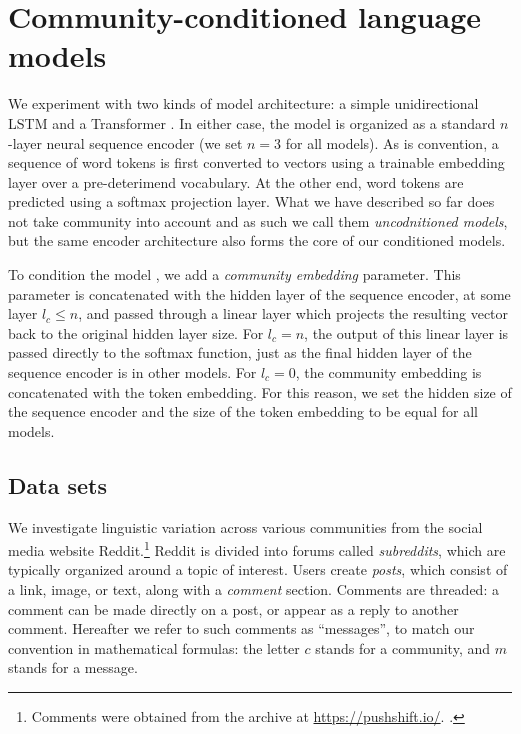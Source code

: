 \documentclass[11pt]{article}
\begin{document}

\section{Community-conditioned language models}

We experiment with two kinds of model architecture: a simple
unidirectional LSTM \citep{Hochreiter1997} and a Transformer
\citep{Vaswani2017}.  In either case, the model is organized as a
standard $n$-layer neural sequence encoder (we set $n=3$ for all
models). As is convention, a sequence of word tokens is first converted to 
vectors using a trainable embedding layer over a pre-deterimend vocabulary.
At the other end, word tokens are predicted using a softmax projection 
layer. What we have described so far does not take community into account
and as such we call them \emph{uncodnitioned models}, but the same
encoder architecture also forms the core of our conditioned models.

To condition the model , we add a \emph{community embedding} parameter.
This parameter is concatenated with the hidden layer of the
sequence encoder, at some layer $l_c \leq n$, and passed through a
linear layer which projects the resulting vector back to the original
hidden layer size.  For $l_c = n$, the output of this linear layer is
passed directly to the softmax function, just as the final hidden
layer of the sequence encoder is in other models.  For $l_c=0$, the
community embedding is concatenated with the token embedding.  For
this reason, we set the hidden size of the sequence encoder and the
size of the token embedding to be equal for all models.


\subsection{Data sets}

We investigate linguistic variation across various communities 
from the social media website Reddit.\footnote{Comments were obtained
  from the archive at \url{https://pushshift.io/}.
  \cite{Baumgartner2020}.}
%
Reddit is divided into forums called \textit{subreddits}, 
which are typically organized around a topic of interest. 
Users create \textit{posts}, which consist of a link, image, 
or text, along with a \emph{comment} section. 
Comments are threaded: a comment can be made directly on a post,
or appear as a reply to another comment.
%
Hereafter we refer to such comments as ``messages'', to match our
convention in mathematical formulas: the letter $c$ stands for a
community, and $m$ stands for a message.
\end{document}

